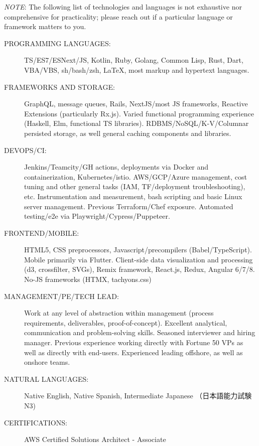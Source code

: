 \documentclass[letterpaper,11pt]{article}
\begin{document}
\vspace{2pt}
\textit{NOTE}: The following list of technologies and languages is not exhaustive nor comprehensive for practicality; please reach out if a particular language or framework matters to you.
\begin{description}
	\item[PROGRAMMING LANGUAGES:]
    TS/ES7/ESNext/JS, Kotlin, Ruby, Golang, Common Lisp, Rust, Dart, VBA/VBS, sh/bash/zsh, \LaTeX, most markup and hypertext languages. 

	\item[FRAMEWORKS AND STORAGE:]
    GraphQL, message queues, Rails, NextJS/most JS frameworks, Reactive Extensions (particularly Rx.js). Varied functional programming experience (Haskell, Elm, functional TS libraries). RDBMS/NoSQL/K-V/Columnar persisted storage, as well general caching components and libraries.

	\item [DEVOPS/CI:]
    Jenkins/Teamcity/GH actions, deployments via Docker and containerization, Kubernetes/istio. AWS/GCP/Azure management, cost tuning and other general tasks (IAM, TF/deployment troubleshooting), etc. Instrumentation and measurement, bash scripting and basic Linux server management. Previous Terraform/Chef exposure. Automated testing/e2e via Playwright/Cypress/Puppeteer.

  \item [FRONTEND/MOBILE:]
    HTML5, CSS preprocessors, Javascript/precompilers (Babel/TypeScript). Mobile primarily via Flutter. Client-side data visualization and processing (d3, crossfilter, SVGs), Remix framework, React.js, Redux, Angular 6/7/8. No-JS frameworks (HTMX, tachyons.css)

	\item[MANAGEMENT/PE/TECH LEAD:]
    Work at any level of abstraction within management (process requirements, deliverables, proof-of-concept). Excellent analytical, communication and problem-solving skills. Seasoned interviewer and hiring manager. Previous experience working directly with Fortune 50 VPs as well as directly with end-users. Experienced leading offshore, as well as onshore teams.

	\item[NATURAL LANGUAGES:]
    Native English, Native Spanish, Intermediate Japanese {（日本語能力試験N3)}

	\item[CERTIFICATIONS:]
		AWS Certified Solutions Architect - Associate

\end{description}
\end{document}
